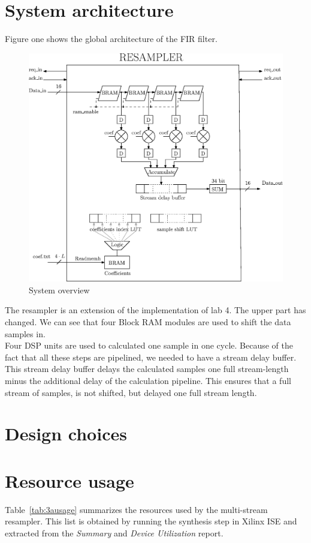 \documentclass[a4paper,twoside,11pt, fleqn]{article}
\begin{document}
\newpage
\section{System architecture}
Figure one shows the global architecture of the FIR filter. 
\begin{figure}[h]
	\includegraphics[scale = 0.85]{Images/5_blockdiagram}
    \caption{System overview}
\end{figure}

The resampler is an extension of the implementation of lab 4. The upper part has changed. We can see that four Block RAM modules are used to shift the data samples in.\\

Four DSP units are used to calculated one sample in one cycle. Because of the fact that all these steps are pipelined, we needed to have a stream delay buffer. This stream delay buffer delays the calculated samples one full stream-length minus the additional delay of the calculation pipeline. This ensures that a full stream of samples, is not shifted, but delayed one full stream length.

\newpage
\section{Design choices}

\newpage
\section{Resource usage}
Table~\ref{tab:3ausage} summarizes the resources used by the multi-stream resampler. This list is obtained by running the synthesis step in Xilinx ISE and extracted from the \textit{Summary} and \textit{Device Utilization} report.
\end{document}
